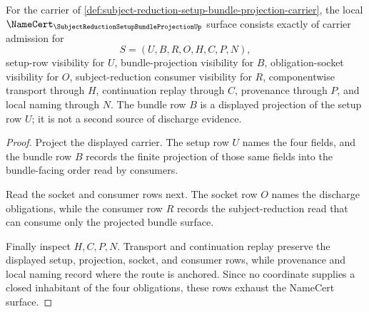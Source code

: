 \begin{theorem}
\label{thm:subject-reduction-setup-bundle-projection-namecert-obligations}
For the carrier of \autoref{def:subject-reduction-setup-bundle-projection-carrier}, the local $\NameCert_{\SubjectReductionSetupBundleProjectionUp}$ surface consists exactly of carrier admission for
$$
S=(U,B,R,O,H,C,P,N),
$$
setup-row visibility for $U$, bundle-projection visibility for $B$, obligation-socket visibility for $O$, subject-reduction consumer visibility for $R$, componentwise transport through $H$, continuation replay through $C$, provenance through $P$, and local naming through $N$. The bundle row $B$ is a displayed projection of the setup row $U$; it is not a second source of discharge evidence.
\end{theorem}
\begin{proof}
Project the displayed carrier. The setup row $U$ names the four fields, and the bundle row $B$ records the finite projection of those same fields into the bundle-facing order read by consumers.

Read the socket and consumer rows next. The socket row $O$ names the discharge obligations, while the consumer row $R$ records the subject-reduction read that can consume only the projected bundle surface.

Finally inspect $H,C,P,N$. Transport and continuation replay preserve the displayed setup, projection, socket, and consumer rows, while provenance and local naming record where the route is anchored. Since no coordinate supplies a closed inhabitant of the four obligations, these rows exhaust the NameCert surface.
\end{proof}

